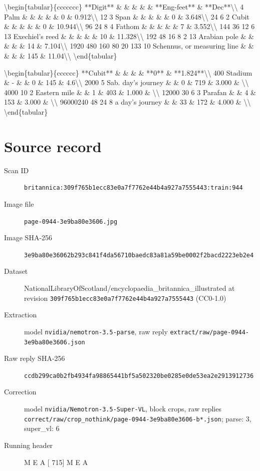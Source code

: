 \documentclass{article}
\begin{document}
\textbackslash{}begin\{tabular\}\{ccccccc\}
**Digit** \& \& \& \& \& **Eng-feet** \& **Dec**\textbackslash{}\textbackslash{}
4 Palm \& \& \& \& \& 0 \& 0.912\textbackslash{}\textbackslash{}
12 3 Span \& \& \& \& \& 0 \& 3.648\textbackslash{}\textbackslash{}
24 6 2 Cubit \& \& \& \& \& 0 \& 10.944\textbackslash{}\textbackslash{}
96 24 8 4 Fathom \& \& \& \& \& 7 \& 3.552\textbackslash{}\textbackslash{}
144 36 12 6 13 Exechiel's reed \& \& \& \& \& 10 \& 11.328\textbackslash{}\textbackslash{}
192 48 16 8 2 13 Arabian pole \& \& \& \& \& 14 \& 7.104\textbackslash{}\textbackslash{}
1920 480 160 80 20 133 10 Schennus, or measuring line \& \& \& \& \& 145 \& 11.04\textbackslash{}\textbackslash{}
\textbackslash{}end\{tabular\}

\textbackslash{}begin\{tabular\}\{cccccc\}
**Cubit** \& \& \& \& **0** \& **1.824**\textbackslash{}\textbackslash{}
400 Stadium \& - \& \& 0 \& 145 \& 4.6\textbackslash{}\textbackslash{}
2000 5 Sab. day's journey \& \& 0 \& 719 \& 3.000 \& \textbackslash{}\textbackslash{}
4000 10 2 Eastern mile \& \& 1 \& 403 \& 1.000 \& \textbackslash{}\textbackslash{}
12000 30 6 3 Parafan \& \& 4 \& 153 \& 3.000 \& \textbackslash{}\textbackslash{}
96000240 48 24 8 a day's journey \& \& 33 \& 172 \& 4.000 \& \textbackslash{}\textbackslash{}
\textbackslash{}end\{tabular\}


\section*{Source record}
\begin{description}
\item[Scan ID] \texttt{britannica:309f765b1ecc83e0a7f7762e44b4a927a7555443:train:944}
\item[Image file] \texttt{page-0944-3e9ba80e3606.jpg}
\item[Image SHA-256] \texttt{3e9ba80e36062b293c841f4da56710baedc83a81a59be0002f2bacd2223eb2e4}
\item[Dataset] NationalLibraryOfScotland/encyclopaedia\_britannica\_illustrated at revision \texttt{309f765b1ecc83e0a7f7762e44b4a927a7555443} (CC0-1.0)
\item[Extraction] model \texttt{nvidia/nemotron-3.5-parse}, raw reply \texttt{extract/raw/page-0944-3e9ba80e3606.json}
\item[Raw reply SHA-256] \texttt{ccdb299ca0b2fb4934fa98865441bf5a502320be0285e0de53ea2e2913912736}
\item[Correction] model \texttt{nvidia/Nemotron-3.5-Super-VL}, block crops, raw replies \texttt{correct/raw/crop\_nothink/page-0944-3e9ba80e3606-b*.json}; parse: 3, super\_vl: 6
\item[Running header] M E A [ 715] M E A
\end{description}
\end{document}
